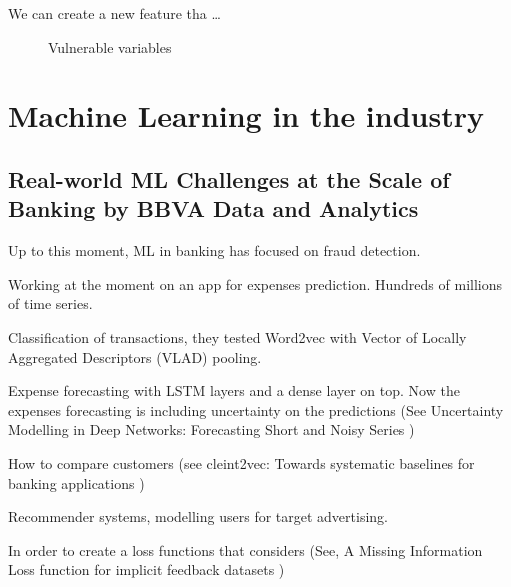 \documentclass[b5paper]{report}
\begin{document}
We can create a new feature tha \dots

\begin{figure}[h]
  \centering
  \caption{Vulnerable variables}
\end{figure}

\chapter{Machine Learning in the industry}

\section{Real-world ML Challenges at the Scale of Banking by BBVA Data and
Analytics}

Up to this moment, ML in banking has focused on fraud detection.

Working at the moment on an app for expenses prediction. Hundreds of millions
of time series.

Classification of transactions, they tested Word2vec with Vector of Locally
Aggregated Descriptors (VLAD) pooling.

Expense forecasting with LSTM layers and a dense layer on top. Now the expenses
forecasting is including uncertainty on the predictions (See Uncertainty
  Modelling in Deep Networks: Forecasting Short and Noisy Series
\cite{brando2018uncertainty})

How to compare customers (see cleint2vec: Towards systematic baselines for
banking applications \cite{baldassini2018client2vec})

Recommender systems, modelling users for target advertising.

In order to create a loss functions that considers (See, A Missing Information
Loss function for implicit feedback datasets \cite{arevalo2018missing} )
\end{document}
